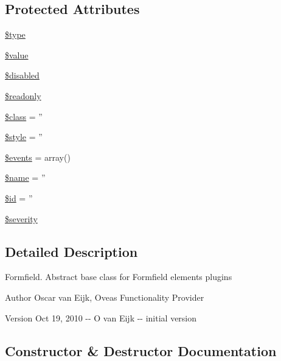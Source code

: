 \subsection*{Protected Attributes}
\begin{DoxyCompactItemize}
\item 
\hyperlink{classFormFieldPlugin_acf8210731f7b8dcee47d777975bc91ca}{\$type}
\item 
\hyperlink{classFormFieldPlugin_abbe128149202f43e8fcac8184018048c}{\$value}
\item 
\hyperlink{classFormFieldPlugin_a2e589ab9610052dfbba6170d6117be37}{\$disabled}
\item 
\hyperlink{classFormFieldPlugin_a707acf02de21b2b7975b2aa362615ce0}{\$readonly}
\item 
\hyperlink{classBaseElement_a99976a8e967db92e7800309f359b0803}{\$class} = ''
\item 
\hyperlink{classBaseElement_a429a3d642dd95f30e1059ef29564b87d}{\$style} = ''
\item 
\hyperlink{classBaseElement_a02cebe45d277b4ff8f29db08bad371ba}{\$events} = array()
\item 
\hyperlink{classBaseElement_a30b8cff187a9de659a70daf287d66f45}{\$name} = ''
\item 
\hyperlink{classBaseElement_a11b6989c43b53869a09f5ce65aa55b45}{\$id} = ''
\item 
\hyperlink{class__OWL_ad26b40a9dbbacb33e299b17826f8327c}{\$severity}
\end{DoxyCompactItemize}


\subsection{Detailed Description}
Formfield. Abstract base class for Formfield elements plugins \begin{DoxyAuthor}{Author}
Oscar van Eijk, Oveas Functionality Provider 
\end{DoxyAuthor}
\begin{DoxyVersion}{Version}
Oct 19, 2010 -\/-\/ O van Eijk -\/-\/ initial version 
\end{DoxyVersion}


\subsection{Constructor \& Destructor Documentation}

